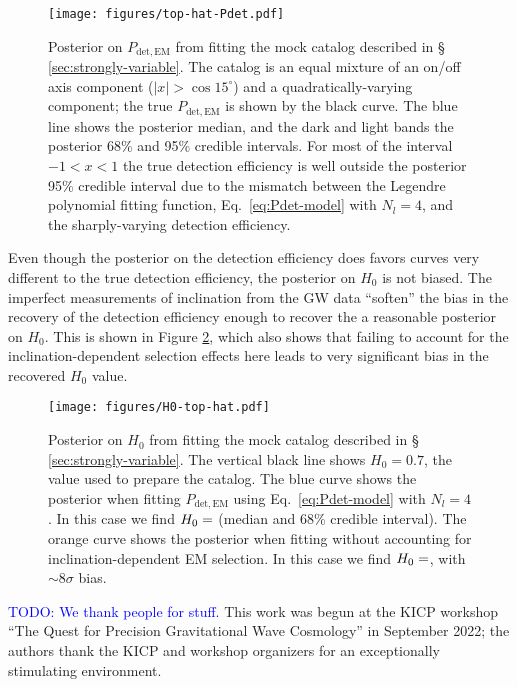 \documentclass[modern]{aastex631}
\newcommand{\todo}[1]{\textcolor{blue}{TODO: #1}}
\newcommand{\detected}{\mathrm{det}}
\newcommand{\EM}{\mathrm{EM}}
\begin{document}
\begin{figure}
    \texttt{[image: figures/top-hat-Pdet.pdf]}
    \caption{Posterior on $P_{\detected,\EM}$ from fitting the mock catalog
    described in \S\, \ref{sec:strongly-variable}.  The catalog is an equal
    mixture of an on/off axis component ($|x| > \cos 15^\circ$) and a
    quadratically-varying component; the true $P_{\detected,\EM}$ is shown by
    the black curve.  The blue line shows the posterior median, and the dark and
    light bands the posterior 68\% and 95\% credible intervals.  For most of the
    interval $-1 < x < 1$ the true detection efficiency is well outside the
    posterior 95\% credible interval due to the mismatch between the Legendre
    polynomial fitting function, Eq.\ \eqref{eq:Pdet-model} with $N_l = 4$, and
    the sharply-varying detection efficiency.}
    \label{fig:top-hat-Pdet}
\end{figure}

Even though the posterior on the detection efficiency does favors curves very
different to the true detection efficiency, the posterior on $H_0$ is not
biased.  The imperfect measurements of inclination from the GW data ``soften''
the bias in the recovery of the detection efficiency enough to recover the a
reasonable posterior on $H_0$.  This is shown in Figure \ref{fig:H0-top-hat},
which also shows that failing to account for the inclination-dependent selection
effects here leads to very significant bias in the recovered $H_0$ value.

\begin{figure}
    \texttt{[image: figures/H0-top-hat.pdf]}
    \caption{Posterior on $H_0$ from fitting the mock catalog described in \S\,
    \ref{sec:strongly-variable}.  The vertical black line shows $H_0 = 0.7$, the
    value used to prepare the catalog.  The blue curve shows the posterior when
    fitting $P_{\detected,\EM}$ using Eq.\ \eqref{eq:Pdet-model} with $N_l=4$.
    In this case we find $H_0 = \variable{output/H0-top-hat.txt}$ (median and
    68\% credible interval).  The orange curve shows the posterior when fitting
    without accounting for inclination-dependent EM selection.  In this case we
    find $H_0 = \variable{output/H0-top-hat-flat.txt}$, with $\sim 8 \sigma$
    bias.}
    \label{fig:H0-top-hat}
\end{figure}

\begin{acknowledgments}
    \todo{We thank people for stuff.}  This work was begun at the KICP workshop
    ``The Quest for Precision Gravitational Wave Cosmology'' in September 2022;
    the authors thank the KICP and workshop organizers for an exceptionally
    stimulating environment.
\end{acknowledgments}


\clearpage


\end{document}
